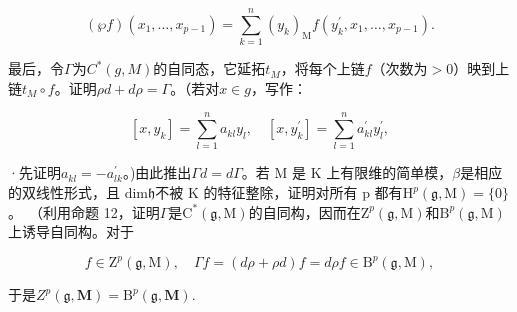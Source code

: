 \[
(\wp f) (x _ {1}, \dots , x _ {p - 1}) = \sum_ {k = 1} ^ {n} (y _ {k}) _ {\mathrm{M}} f (y _ {k} ^ {\prime}, x _ {1}, \dots , x _ {p - 1}).
\]

最后，令\(\Gamma\)为\(C^*(g, M)\)的自同态，它延拓\(t_M\)，将每个上链\(f\)（次数为\(>0\)）映到上链\(t_M \circ f\)。证明\(\rho d + d\rho = \Gamma\)。（若对\(x \in g\)，写作：

\[
[ x, y _ {k} ] = \sum_ {l = 1} ^ {n} a _ {k l} y _ {l}, \quad [ x, y _ {k} ^ {\prime} ] = \sum_ {l = 1} ^ {n} a _ {k l} ^ {\prime} y _ {l} ^ {\prime},
\]

·先证明\(a_{kl} = -a_{lk}^{\prime}\)。)由此推出\(\Gamma d = d\Gamma\)。若 M 是 K 上有限维的简单模，\(\beta\)是相应的双线性形式，且 dim\(\mathfrak{h}\)不被 K 的特征整除，证明对所有 p 都有\(\mathrm{H}^{p}(\mathfrak{g},\mathrm{M})=\{0\}\)。~（利用命题 12，证明\(\Gamma\)是\(\mathrm{C}^{*}(\mathfrak{g},\mathrm{M})\)的自同构，因而在\(\mathrm{Z}^{p}(\mathfrak{g},\mathrm{M})\)和\(\mathrm{B}^{p}(\mathfrak{g},\mathrm{M})\)上诱导自同构。对于

\[
f \in \mathrm{Z} ^ {p} (\mathfrak {g}, \mathrm{M}), \quad \Gamma f = (d \rho + \rho d) f = d \rho f \in \mathrm{B} ^ {p} (\mathfrak {g}, \mathrm{M}),
\]

于是\(Z^{p}(\mathfrak{g},\mathbf{M}) = \mathrm{B}^{p}(\mathfrak{g},\mathbf{M}).\)

